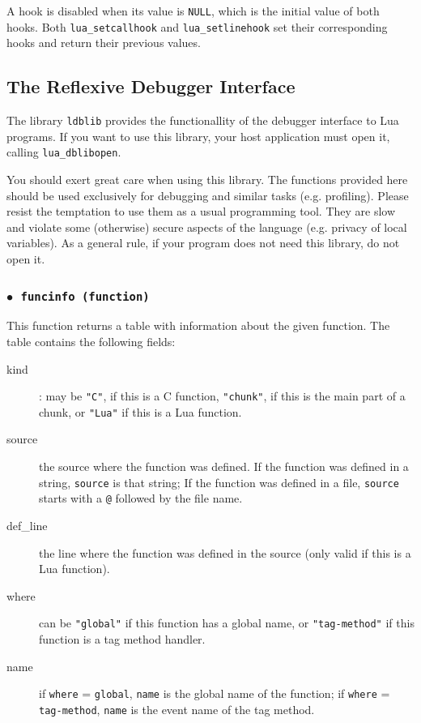 \documentclass[11pt]{article}
\newcommand{\T}[1]{{\tt #1}}
\newcommand{\Deffunc}[1]{\index{#1}}
\newcommand{\ff}{$\bullet$\ }
\begin{document}
A hook is disabled when its value is \verb|NULL|,
which is the initial value of both hooks.
Both \verb|lua_setcallhook| and \verb|lua_setlinehook|
set their corresponding hooks and return their previous values.



\subsection{The Reflexive Debugger Interface}

The library \verb|ldblib| provides
the functionallity of the debugger interface to Lua programs.
If you want to use this library,
your host application must open it,
calling \verb|lua_dblibopen|.

You should exert great care when using this library.
The functions provided here should be used exclusively for debugging
and similar tasks (e.g. profiling).
Please resist the temptation to use them as a
usual programming tool.
They are slow and violate some (otherwise) secure aspects of the
language (e.g. privacy of local variables).
As a general rule, if your program does not need this library,
do not open it.


\subsubsection*{\ff \T{funcinfo (function)}}\Deffunc{funcinfo}

This function returns a table with information about the given function.
The table contains the following fields:
\begin{description}
\item[kind]: may be \verb|"C"|, if this is a C function,
\verb|"chunk"|, if this is the main part of a chunk,
or \verb|"Lua"| if this is a Lua function.

\item[source] the source where the function was defined.
If the function was defined in a string,
\verb|source| is that string;
If the function was defined in a file,
\verb|source| starts with a \verb|@| followed by the file name.

\item[def\_line] the line where the function was defined in the source
(only valid if this is a Lua function).

\item[where] can be \verb|"global"| if this function has a global name,
or \verb|"tag-method"| if this function is a tag method handler.

\item[name] if \verb|where| = \verb|global|,
\verb|name| is the global name of the function;
if \verb|where| = \verb|tag-method|,
\verb|name| is the event name of the tag method.
\end{description}
\end{document}
